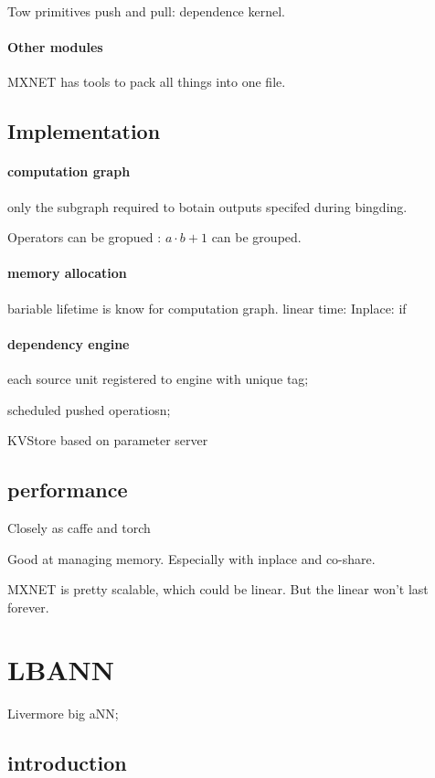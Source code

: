 \documentclass[12pt]{article}
\begin{document}
Tow primitives push and pull: dependence kernel.

\paragraph{Other modules}
MXNET has tools to pack all things into one file.

\subsection{Implementation}
\paragraph{computation graph}

only the subgraph required to botain outputs specifed during bingding.

Operators can be gropued : $a\cdot b + 1$ can be grouped.

\paragraph{memory allocation}
bariable lifetime is know for computation graph.
linear time: Inplace: if 

\paragraph{dependency engine}
each source unit registered to engine with unique tag;

scheduled pushed operatiosn;

KVStore based on parameter server

\subsection{performance}
Closely as caffe and torch

Good at managing memory. Especially with inplace and co-share.

MXNET is pretty scalable, which could be linear. But the linear won't last forever.

\section{LBANN}
Livermore big aNN;
\subsection{introduction}
\end{document}
